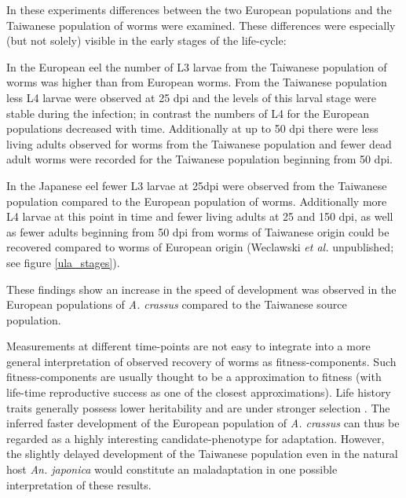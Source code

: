 In these experiments differences between the two European populations
and the Taiwanese population of worms were examined. These differences
were especially (but not solely) visible in the early stages of the
life-cycle:

In the European eel the number of L3 larvae from the Taiwanese
population of worms was higher than from European worms. From the
Taiwanese population less L4 larvae were observed at 25 dpi and the
levels of this larval stage were stable during the infection; in
contrast the numbers of L4 for the European populations decreased with
time. Additionally at up to 50 dpi there were less living adults
observed for worms from the Taiwanese population and fewer dead adult
worms were recorded for the Taiwanese population beginning from 50
dpi.

In the Japanese eel fewer L3 larvae at 25dpi were observed from the
Taiwanese population compared to the European population of
worms. Additionally more L4 larvae at this point in time and fewer
living adults at 25 and 150 dpi, as well as fewer adults beginning
from 50 dpi from worms of Taiwanese origin could be recovered compared
to worms of European origin (Weclawski \textit{et al.} unpublished;
see figure \ref{ula_stages}).

These findings show an increase in the speed of development was
observed in the European populations of \textit{A. crassus} compared
to the Taiwanese source population.

Measurements at different time-points are not easy to integrate into a
more general interpretation of observed recovery of worms as
fitness-components. Such fitness-components are usually thought to be
a approximation to fitness (with life-time reproductive success as one
of the closest approximations). Life history traits generally possess
lower heritability and are under stronger selection
\cite{pmid3316130}. The inferred faster development of the European
population of \textit{A. crassus} can thus be regarded as a highly
interesting candidate-phenotype for adaptation. However, the slightly
delayed development of the Taiwanese population even in the natural
host \textit{An. japonica} would constitute an maladaptation
\cite{pmid21708731} in one possible interpretation of these results.


